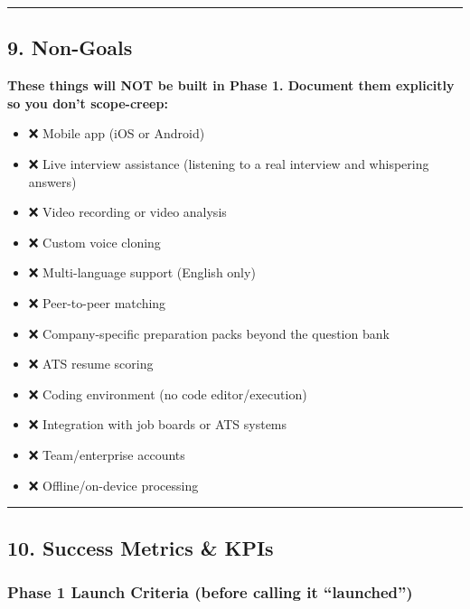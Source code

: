 \documentclass[
  11pt,
]{article}
\providecommand{\tightlist}{%
  \setlength{\itemsep}{0pt}\setlength{\parskip}{0pt}}
\begin{document}
\begin{center}\rule{0.5\linewidth}{0.5pt}\end{center}

\hypertarget{non-goals}{%
\subsection{9. Non-Goals}\label{non-goals}}

\textbf{These things will NOT be built in Phase 1. Document them
explicitly so you don't scope-creep:}

\begin{itemize}
\tightlist
\item
  ❌ Mobile app (iOS or Android)
\item
  ❌ Live interview assistance (listening to a real interview and
  whispering answers)
\item
  ❌ Video recording or video analysis
\item
  ❌ Custom voice cloning
\item
  ❌ Multi-language support (English only)
\item
  ❌ Peer-to-peer matching
\item
  ❌ Company-specific preparation packs beyond the question bank
\item
  ❌ ATS resume scoring
\item
  ❌ Coding environment (no code editor/execution)
\item
  ❌ Integration with job boards or ATS systems
\item
  ❌ Team/enterprise accounts
\item
  ❌ Offline/on-device processing
\end{itemize}

\begin{center}\rule{0.5\linewidth}{0.5pt}\end{center}

\hypertarget{success-metrics-kpis}{%
\subsection{10. Success Metrics \& KPIs}\label{success-metrics-kpis}}

\hypertarget{phase-1-launch-criteria-before-calling-it-launched}{%
\subsubsection{Phase 1 Launch Criteria (before calling it
``launched'')}\label{phase-1-launch-criteria-before-calling-it-launched}}
\end{document}
